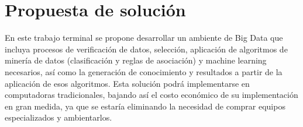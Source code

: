 \section{Propuesta de solución}
En este trabajo terminal se propone desarrollar un ambiente de Big Data que incluya procesos de verificación de datos, selección, aplicación de algoritmos de minería de datos (clasificación y reglas de asociación) y machine learning necesarios, así como la generación de conocimiento y resultados a partir de la aplicación de esos algoritmos. Esta solución podrá implementarse en computadoras tradicionales, bajando así el costo económico de su implementación en gran medida, ya que se estaría eliminando la necesidad de comprar equipos especializados y ambientarlos.